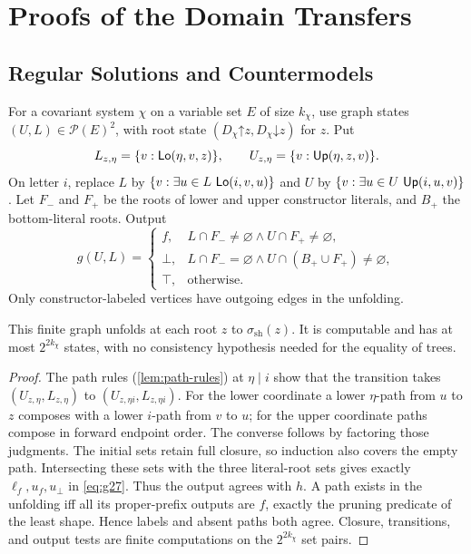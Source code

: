 \section{Proofs of the Domain Transfers}
\label{app:domains}

\subsection{Regular Solutions and Countermodels}\label{sec:regular}
For a covariant system $\chi$ on a variable set $E$ of size $k_\chi$,
use graph states $(U,L)\in\mathcal P(E)^2$, with root state
$(D_\chi\mathord\uparrow z,D_\chi\mathord\downarrow z)$ for $z$.
Put
\begin{equation}\label{eq:g54}
 L_{z,\eta}=\{v:\mathsf{Lo}(\eta,v,z)\},\qquad
 U_{z,\eta}=\{v:\mathsf{Up}(\eta,z,v)\}.
\end{equation}
On letter $i$, replace $L$ by $\{v:\exists u\in L\ \mathsf{Lo}(i,v,u)\}$
and $U$ by $\{v:\exists u\in U\ \mathsf{Up}(i,u,v)\}$.
Let $F_-$ and $F_+$ be the roots of lower and upper constructor literals,
and $B_+$ the bottom-literal roots. Output
\[
 g(U,L)=\begin{cases}
 f,&L\cap F_-\ne\varnothing\land U\cap F_+\ne\varnothing,\\
 \bot,&L\cap F_-=\varnothing\land U\cap(B_+\cup F_+)\ne\varnothing,\\
 \top,&\text{otherwise}.
 \end{cases}
\]
Only constructor-labeled vertices have outgoing edges in the unfolding.

\begin{theorem}\label{thm:shape-graph}
This finite graph unfolds at each root $z$ to $\sigma_{\mathrm{sh}}(z)$.
It is computable and has at most $2^{2k_\chi}$ states, with no consistency
hypothesis needed for the equality of trees.
\end{theorem}
\begin{proof}
The path rules (\cref{lem:path-rules}) at $\eta\mid i$ show
that the transition takes $(U_{z,\eta},L_{z,\eta})$ to
$(U_{z,\eta i},L_{z,\eta i})$. For the lower coordinate a lower
$\eta$-path from $u$ to $z$ composes with a lower $i$-path from $v$ to $u$;
for the upper coordinate paths compose in forward endpoint order.
The converse follows by factoring those judgments. The initial sets
retain full closure, so induction also covers the empty path.
Intersecting these sets with the three literal-root sets gives exactly
$\ell_f,u_f,u_\bot$ in \eqref{eq:g27}. Thus the output agrees with $h$.
A path exists in the unfolding iff all its proper-prefix outputs are $f$,
exactly the pruning predicate of the least shape. Hence labels and absent
paths both agree. Closure, transitions, and output tests are finite
computations on the $2^{2k_\chi}$ set pairs.
\end{proof}

